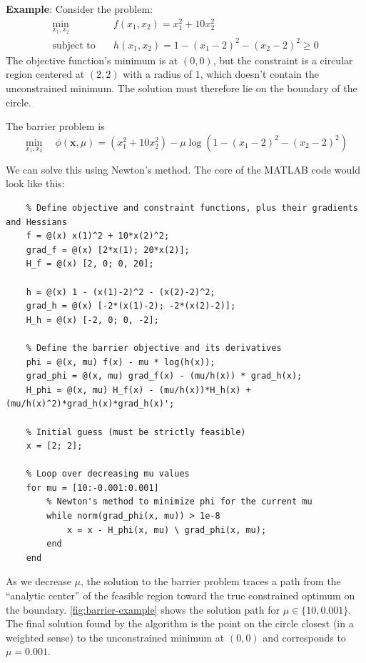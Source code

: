 \begin{exampleBox}
    \textbf{Example}:
    Consider the problem:
    \begin{equation}
    \begin{aligned}
    \min_{x_1, x_2} \quad & f(x_1, x_2) = x_1^2 + 10x_2^2 \\
    \text{subject to} \quad & h(x_1, x_2) = 1 - (x_1 - 2)^2 - (x_2 - 2)^2 \ge 0
    \end{aligned}
    \end{equation}
    The objective function's minimum is at $(0,0)$, but the constraint is a circular region centered at $(2,2)$ with a radius of 1, which doesn't contain the unconstrained minimum. The solution must therefore lie on the boundary of the circle.

    The barrier problem is
    \begin{equation}
    \min_{x_1, x_2} \quad \phi(\mathbf{x}, \mu) = (x_1^2 + 10x_2^2) - \mu \log\left(1 - (x_1 - 2)^2 - (x_2 - 2)^2\right)
    \label{eq:barrier-problem-example}
    \end{equation}

    We can solve this using Newton's method. The core of the MATLAB code would look like this:

    \begin{verbatim}
    % Define objective and constraint functions, plus their gradients and Hessians
    f = @(x) x(1)^2 + 10*x(2)^2;
    grad_f = @(x) [2*x(1); 20*x(2)];
    H_f = @(x) [2, 0; 0, 20];

    h = @(x) 1 - (x(1)-2)^2 - (x(2)-2)^2;
    grad_h = @(x) [-2*(x(1)-2); -2*(x(2)-2)];
    H_h = @(x) [-2, 0; 0, -2];

    % Define the barrier objective and its derivatives
    phi = @(x, mu) f(x) - mu * log(h(x));
    grad_phi = @(x, mu) grad_f(x) - (mu/h(x)) * grad_h(x);
    H_phi = @(x, mu) H_f(x) - (mu/h(x))*H_h(x) + (mu/h(x)^2)*grad_h(x)*grad_h(x)';

    % Initial guess (must be strictly feasible)
    x = [2; 2];

    % Loop over decreasing mu values
    for mu = [10:-0.001:0.001]
        % Newton's method to minimize phi for the current mu
        while norm(grad_phi(x, mu)) > 1e-8
            x = x - H_phi(x, mu) \ grad_phi(x, mu);
        end
    end
    \end{verbatim}

    As we decrease $\mu$, the solution to the barrier problem traces a path from the ``analytic center'' of the feasible region toward the true constrained optimum on the boundary. \autoref{fig:barrier-example} shows the solution path for $\mu\in\{10,0.001\}$. The final solution found by the algorithm is the point on the circle closest (in a weighted sense) to the unconstrained minimum at $(0,0)$ and corresponds to $\mu=0.001$.


\end{exampleBox}
